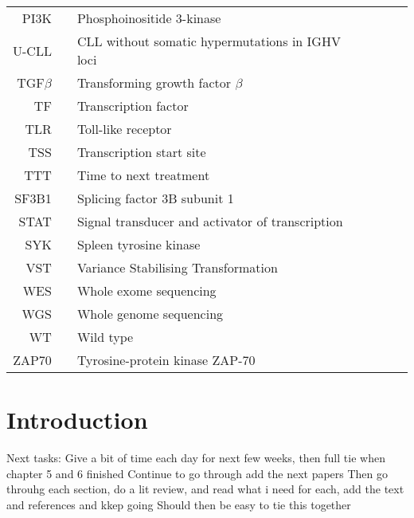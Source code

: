 \documentclass[11pt, a4paper, twosided]{book}
\begin{document}
\begin{tabular}{rp{0.2cm}lp{1cm}rp{0.2cm}l}
    PI3K & & Phosphoinositide 3-kinase \\
    U-CLL & & CLL without somatic hypermutations in IGHV loci \\
    TGF$\beta$ & & Transforming growth factor $\beta$ \\
    TF & & Transcription factor \\
    TLR & & Toll-like receptor \\ 
    TSS & & Transcription start site \\
    TTT & & Time to next treatment \\
    SF3B1 & & Splicing factor 3B subunit 1 \\
    STAT & & Signal transducer and activator of transcription \\
    SYK & & Spleen tyrosine kinase \\
    VST & & Variance Stabilising Transformation \\
    WES & & Whole exome sequencing \\
    WGS & & Whole genome sequencing \\
    WT & & Wild type \\
    ZAP70 & & Tyrosine-protein kinase ZAP-70 \\

    
   
\end{tabular}
\newpage
\listoffigures
{}

\newpage
\listoftables
{}

\newpage
\pagestyle{plain}
\setcounter{page}{1}    %

\hypertarget{introduction}{%
\chapter{Introduction}\label{introduction}}

Next tasks:
Give a bit of time each day for next few weeks, then full tie when chapter 5 and 6 finished
Continue to go through add the next papers
Then go throuhg each section, do a lit review, and read what i need for each, add the text and references and kkep going
Should then be easy to tie this together
\end{document}
